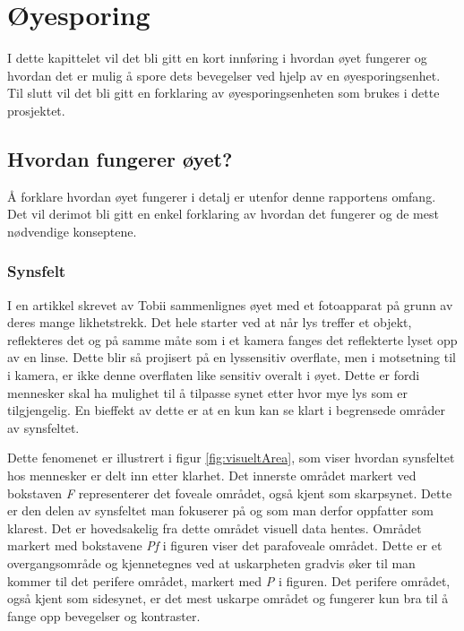 
\chapter{Øyesporing}

I dette kapittelet vil det bli gitt en kort innføring i hvordan øyet fungerer og hvordan det er mulig å spore dets bevegelser ved hjelp av en øyesporingsenhet. Til slutt vil det bli gitt en forklaring av øyesporingsenheten som brukes i dette prosjektet.

\section{Hvordan fungerer øyet?}

Å forklare hvordan øyet fungerer i detalj er utenfor denne rapportens omfang. Det vil derimot bli gitt en enkel forklaring av hvordan det fungerer og de mest nødvendige konseptene.

\subsection{Synsfelt}

I en artikkel skrevet av Tobii \cite{Calibration} sammenlignes øyet med et fotoapparat på grunn av deres mange likhetstrekk. Det hele starter ved at når lys treffer et objekt, reflekteres det og på samme måte som i et kamera fanges det reflekterte lyset opp av en linse. Dette blir så projisert på en lyssensitiv overflate, men i motsetning til i kamera, er ikke denne overflaten like sensitiv overalt i øyet. Dette er fordi mennesker skal ha mulighet til å tilpasse synet etter hvor mye lys som er tilgjengelig. En bieffekt av dette er at en kun kan se klart i begrensede områder av synsfeltet. 

Dette fenomenet er illustrert i figur \ref{fig:visueltArea}, som viser hvordan synsfeltet hos mennesker er delt inn etter klarhet. Det innerste området markert ved bokstaven \textit{F} representerer det foveale området, også kjent som skarpsynet. Dette er den delen av synsfeltet man fokuserer på og som man derfor oppfatter som klarest. Det er hovedsakelig fra dette området visuell data hentes. Området markert med bokstavene \textit{Pf} i figuren viser det parafoveale området. Dette er et overgangsområde og kjennetegnes ved at uskarpheten gradvis øker til man kommer til det perifere området, markert med \textit{P} i figuren. Det perifere området, også kjent som sidesynet, er det mest uskarpe området og fungerer kun bra til å fange opp bevegelser og kontraster.

